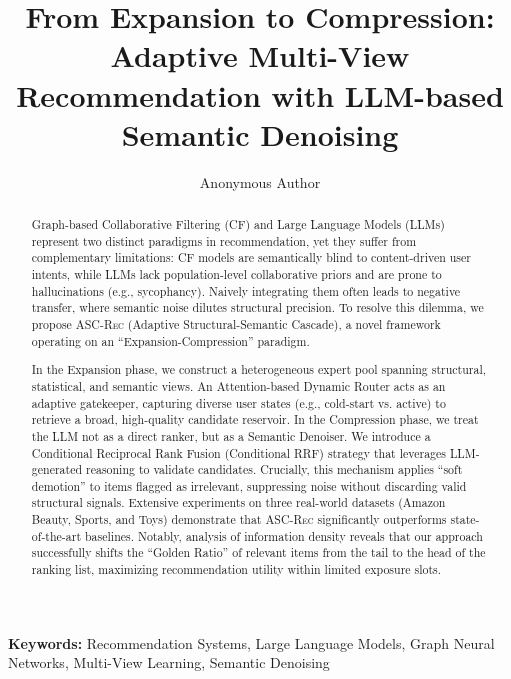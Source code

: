 \documentclass[10pt, a4paper]{article}
\newcommand{\ASCRec}{\textsc{ASC-Rec}}
\begin{document}
\title{From Expansion to Compression: Adaptive Multi-View Recommendation with LLM-based Semantic Denoising}
\author{Anonymous Author}
\date{}

\maketitle

\begin{abstract}
Graph-based Collaborative Filtering (CF) and Large Language Models (LLMs) represent two distinct paradigms in recommendation, yet they suffer from complementary limitations: CF models are semantically blind to content-driven user intents, while LLMs lack population-level collaborative priors and are prone to hallucinations (e.g., sycophancy). Naively integrating them often leads to negative transfer, where semantic noise dilutes structural precision. To resolve this dilemma, we propose \ASCRec{} (Adaptive Structural-Semantic Cascade), a novel framework operating on an ``Expansion-Compression'' paradigm.

In the Expansion phase, we construct a heterogeneous expert pool spanning structural, statistical, and semantic views. An Attention-based Dynamic Router acts as an adaptive gatekeeper, capturing diverse user states (e.g., cold-start vs. active) to retrieve a broad, high-quality candidate reservoir. In the Compression phase, we treat the LLM not as a direct ranker, but as a Semantic Denoiser. We introduce a Conditional Reciprocal Rank Fusion (Conditional RRF) strategy that leverages LLM-generated reasoning to validate candidates. Crucially, this mechanism applies ``soft demotion'' to items flagged as irrelevant, suppressing noise without discarding valid structural signals. Extensive experiments on three real-world datasets (Amazon Beauty, Sports, and Toys) demonstrate that \ASCRec{} significantly outperforms state-of-the-art baselines. Notably, analysis of information density reveals that our approach successfully shifts the ``Golden Ratio'' of relevant items from the tail to the head of the ranking list, maximizing recommendation utility within limited exposure slots.
\end{abstract}

\noindent\textbf{Keywords:} Recommendation Systems, Large Language Models, Graph Neural Networks, Multi-View Learning, Semantic Denoising

\tableofcontents
\newpage







% 
% 
\end{document}
